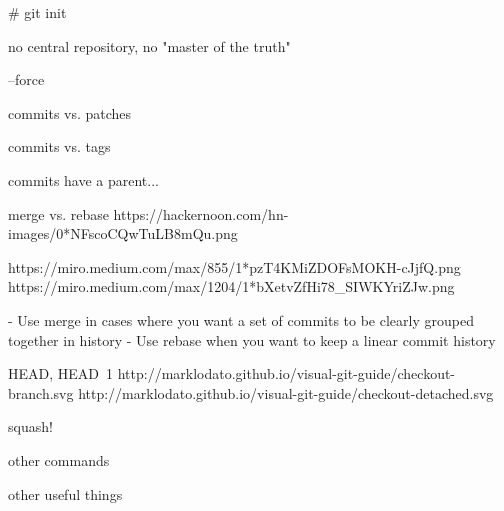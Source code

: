 # git init

no central repository, no "master of the truth"

--force

commits vs. patches

commits vs. tags

commits have a parent...

merge vs. rebase
https://hackernoon.com/hn-images/0*NFscoCQwTuLB8mQu.png

https://miro.medium.com/max/855/1*pzT4KMiZDOFsMOKH-cJjfQ.png
https://miro.medium.com/max/1204/1*bXetvZfHi78_SIWKYriZJw.png

- Use merge in cases where you want a set of commits to be clearly grouped together in history
- Use rebase when you want to keep a linear commit history

HEAD, HEAD~1
http://marklodato.github.io/visual-git-guide/checkout-branch.svg
http://marklodato.github.io/visual-git-guide/checkout-detached.svg

squash!

other commands

other useful things
